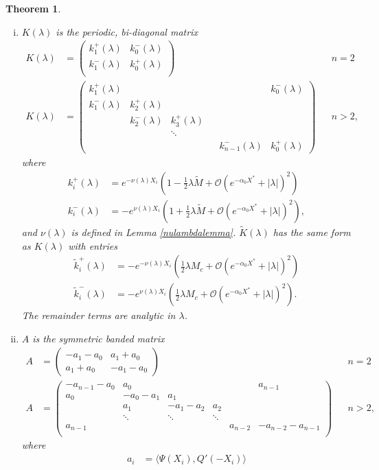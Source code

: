 \documentclass[10pt,reqno]{amsart}
\theoremstyle{plain}
\newtheorem{theorem}{Theorem}
\theoremstyle{definition}
\theoremstyle{remark}
\numberwithin{theorem}{section}
\numberwithin{equation}{section}
\begin{document}
\begin{theorem}
\begin{enumerate}[(i)]
\item $K(\lambda)$ is the periodic, bi-diagonal matrix
\begin{align*}
K(\lambda) &=  
\begin{pmatrix}
k_1^+(\lambda) & k_0^-(\lambda) \\
k_1^-(\lambda) & k_0^+(\lambda) \\
\end{pmatrix} && n = 2\\
K(\lambda) &=  
\begin{pmatrix}
k_1^+(\lambda) & & & & & k_0^-(\lambda) \\
k_1^-(\lambda) & k_2^+(\lambda) \\
& k_2^-(\lambda) & k_3^+(\lambda) \\
  & & \ddots & && \\
& & & & k_{n-1}^-(\lambda) & k_0^+(\lambda)
\end{pmatrix} && n > 2,
\end{align*}
where 
\begin{align*}
k_i^+(\lambda) &= e^{-\nu(\lambda)X_i} \left( 1 - \frac{1}{2}\lambda \tilde{M} + \mathcal{O}(e^{-\alpha_0 X^*} + |\lambda|)^2 \right) \\
k_i^-(\lambda) &= -e^{\nu(\lambda)X_i} \left( 1 + \frac{1}{2}\lambda \tilde{M} + \mathcal{O}(e^{-\alpha_0 X^*} + |\lambda|)^2 \right),
\end{align*}
and $\nu(\lambda)$ is defined in Lemma \ref{nulambdalemma}. $\tilde{K}(\lambda)$ has the same form as $K(\lambda)$ with entries
\begin{align*}
\tilde{k}_i^+(\lambda) &= -e^{-\nu(\lambda)X_i} \left( \frac{1}{2}\lambda M_c + \mathcal{O}(e^{-\alpha_0 X^*} + |\lambda|)^2 \right) \\
\tilde{k}_i^-(\lambda) &= -e^{\nu(\lambda)X_i} \left( \frac{1}{2}\lambda M_c + \mathcal{O}(e^{-\alpha_0 X^*} + |\lambda|)^2 \right).
\end{align*}
The remainder terms are analytic in $\lambda$.

\item $A$ is the symmetric banded matrix
\begin{align}\label{Asymm}
A &= \begin{pmatrix}
-a_1 - a_0 & a_1 + a_0 \\
a_1 + a_0 & - a_1 - a_0 
\end{pmatrix} && n = 2 \\
A &= \begin{pmatrix}
-a_{n-1} - a_0 & a_0 & & &  & a_{n-1}\\
a_0 & -a_0 - a_1 &  a_1 \\
& a_1 & -a_1 - a_2 &  a_2 \\
& \ddots & \ddots & \ddots \\
a_{n-1} & & & & a_{n-2} & -a_{n-2} - a_{n-1} \\
\end{pmatrix} && n > 2,
\end{align}
where
\begin{align*}
a_i &= \langle \Psi(X_i), Q'(-X_i) \rangle
\end{align*}


\end{enumerate}
\end{theorem}
\end{document}
